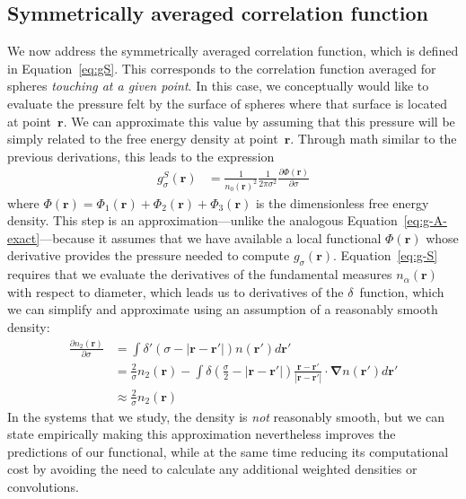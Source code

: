 \documentclass[letterpaper,twocolumn,amsmath,amssymb,jcp,10pt,aip]{revtex4-1}
\newcommand{\rr}{\textbf{r}}
\newcommand{\derivation}[1]{} %
\begin{document}
\derivation{
  \end{widetext}
}

\subsection{Symmetrically averaged correlation function}\label{sec:g-S}

We now address the symmetrically averaged correlation function, which
is defined in Equation~\ref{eq:gS}.  This corresponds to the
correlation function averaged for spheres \emph{touching at a given
  point}.  In this case, we conceptually would like to evaluate the
pressure felt by the surface of spheres where that surface is located
at point~$\rr$.  We can approximate this value by assuming that this
pressure will be simply related to the free energy density at
point~$\rr$.  Through math similar to the previous derivations, this
leads to the expression
\begin{align}
  g_\sigma^S(\rr)%
  &= \frac{1}{n_0(\rr)^2}\frac{1}{ 2\pi \sigma^2}
  \frac{\partial \Phi(\rr)}{\partial \sigma} \label{eq:g-S}
\end{align}
where $\Phi(\rr) = \Phi_1(\rr) + \Phi_2(\rr) + \Phi_3(\rr)$ is the
dimensionless free energy density.  This step is an
approximation---unlike the analogous
Equation~\ref{eq:g-A-exact}---because it assumes that we have
available a local functional $\Phi(\rr)$ whose derivative provides the
pressure needed to compute $g_\sigma(\rr)$.  Equation~\ref{eq:g-S}
requires that we evaluate the derivatives of the fundamental measures
$n_\alpha(\rr)$ with respect to diameter, which leads us to
derivatives of the $\delta$~function, which we can simplify and
approximate using an assumption of a reasonably smooth density:
\begin{align}
  \frac{\partial n_2(\rr)}{\partial \sigma}
  &= \int \delta'(\sigma - |\rr-\rr'|) n(\rr')d\rr' \\
  &= \frac2{\sigma}n_2(\rr) - \int \delta\left(\frac\sigma2 - |\rr-\rr'|\right)
  \frac{\rr-\rr'}{|\rr-\rr'|}\cdot\mathbf{\nabla}n(\rr')d\rr' \\
  &\approx \frac{2}{\sigma}n_2(\rr)
\end{align}
In the systems that we study, the density is \emph{not} reasonably
smooth, but we can state empirically making this approximation
nevertheless improves the predictions of our functional, while at the
same time reducing its computational cost by avoiding the need to
calculate any additional weighted densities or convolutions.
\end{document}
